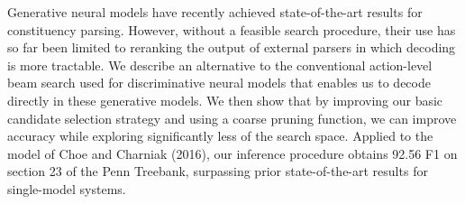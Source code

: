Generative neural models have recently achieved state-of-the-art results for constituency parsing. However, without a feasible search procedure, their use has so far been limited to reranking the output of external parsers in which decoding is more tractable. We describe an alternative to the conventional action-level beam search used for discriminative neural models that enables us to decode directly in these generative models. We then show that by improving our basic candidate selection strategy and using a coarse pruning function, we can improve accuracy while exploring significantly less of the search space. Applied to the model of Choe and Charniak (2016), our inference procedure obtains 92.56 F1 on section 23 of the Penn Treebank, surpassing prior state-of-the-art results for single-model systems.
